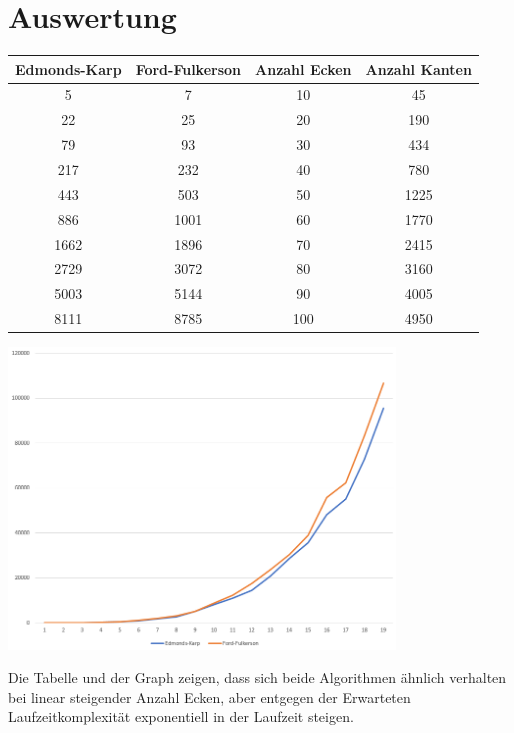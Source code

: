 \documentclass[11pt]{article}
\begin{document}
    \section{Auswertung}
    \begin{center}
        \begin{tabular}{c|c|c|c}
            \textbf{Edmonds-Karp} & \textbf{Ford-Fulkerson} & Anzahl Ecken & Anzahl Kanten\\
            \hline
            5 & 7 & 10 & 45\\
            22 & 25 & 20 & 190\\
            79 & 93 & 30 & 434\\
            217 & 232 & 40 & 780\\
            443 & 503 & 50 & 1225\\
            886 & 1001 & 60 & 1770\\
            1662 & 1896 & 70 & 2415\\
            2729 & 3072 & 80 & 3160\\
            5003 & 5144 & 90 & 4005\\
            8111 & 8785 & 100 & 4950\\
        \end{tabular}
    \end{center}
    \begin{center}
        \includegraphics[height=8cm]{../auswertung.PNG}
    \end{center}
    Die Tabelle und der Graph zeigen, dass sich beide Algorithmen \"ahnlich verhalten bei linear steigender Anzahl Ecken, aber entgegen der Erwarteten Laufzeitkomplexit\"at exponentiell in der Laufzeit steigen.
\end{document}
